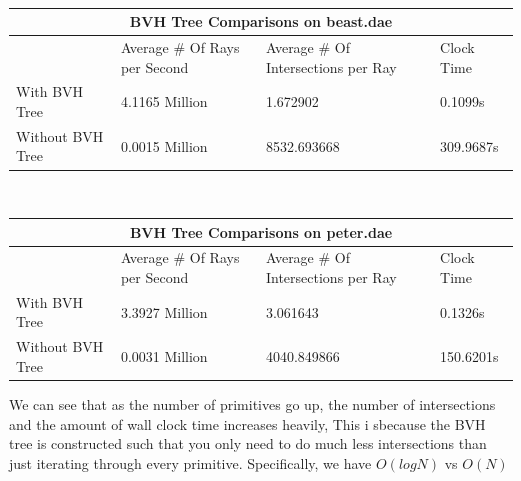 \documentclass{article}
\begin{document}
\\
\begin{tabular}{ |p{3cm}||p{3cm}|p{3cm}|p{3cm}|  }
 \hline
 \multicolumn{4}{|c|}{BVH Tree Comparisons on beast.dae} \\
 \hline
 &  Average \# Of Rays per Second &Average \# Of Intersections per Ray & Clock Time\\
 \hline
 With BVH Tree   & 4.1165 Million    &1.672902 & 0.1099s\\
 Without BVH Tree&   0.0015 Million  & 8532.693668 & 309.9687s\\
 \hline
\end{tabular}
\\
\begin{tabular}{ |p{3cm}||p{3cm}|p{3cm}|p{3cm}|  }
 \hline
 \multicolumn{4}{|c|}{BVH Tree Comparisons on peter.dae} \\
 \hline
 &  Average \# Of Rays per Second &Average \# Of Intersections per Ray & Clock Time\\
 \hline
 With BVH Tree   & 3.3927 Million    & 3.061643 & 0.1326s\\
 Without BVH Tree&   0.0031 Million  & 4040.849866 & 150.6201s\\
 \hline
\end{tabular}
We can see that as the number of primitives go up, the number of intersections and the amount of wall clock time increases heavily, This i sbecause the BVH tree is constructed such that you only need to do much less intersections than just iterating through every primitive. Specifically, we have $O(logN)$ vs $O(N)$
\end{document}
